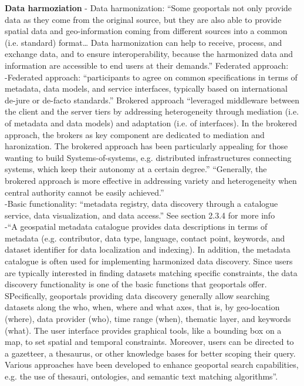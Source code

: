 \textbf{Data harmoziation}
-{\color{orange} Data harmonization: “Some geoportals not only provide data as they come from the original source, but they are also able to provide spatial data and geo-information coming from different sources into a common (i.e. standard) format… Data harmonization can help to receive, process, and exchange data, and to ensure interoperability, because the harmonized data and information are accessible to end users at their demands.” Federated approach: \cite{Jiang2020}}\\
-{\color{orange}Federated approach: “participants to agree on common specifications in terms of metadata, data models, and service interfaces, typically based on international de-jure or de-facto standards.” Brokered approach “leveraged middleware between the client and the server tiers by addressing heterogeneity through mediation (i.e. of metadata and data models) and adaptation (i.e. of interfaces). In the brokered approach, the brokers as key component are dedicated to mediation and haronization. The brokered approach has been particularly appealing for those wanting to build Systems-of-systems, e.g. distributed infrastructures connecting systems, which keep their autonomy at a certain degree.” “Generally, the brokered approach is more effective in addressing variety and heterogeneity when central authority cannot be easily achieved.”\cite{Jiang2020}}\\
-{\color{orange}Basic functionality: “metadata registry, data discovery through a catalogue service, data visualization, and data access.”{\color{red} See section 2.3.4 for more info}\cite{Jiang2020}}\\
-{\color{orange}“A geospatial metadata catalogue provides data descriptions in terms of metadata (e.g. contributor, data type, language, contact point, keywords, and dataset identifier for data localization and indexing). In addition, the metadata catalogue is often used for implementing harmonized data discovery. Since users are typically interested in finding datasets matching specific constraints, the data discovery functionality is one of the basic functions that geoportals offer. SPecifically, geoportals providing data discovery generally allow searching datasets along the who, when, where and what axes, that is, by geo-location (where), data provider (who), time range (when), thematic layer, and keywords (what). The user interface provides graphical tools, like a bounding box on a map, to set spatial and temporal constraints. Moreover, users can be directed to a gazetteer, a thesaurus, or other knowledge bases for better scoping their query. Various approaches have been developed to enhance geoportal search capabilities, e.g. the use of thesauri, ontologies, and semantic text matching algorithms”.\cite{Jiang2020}}\\
